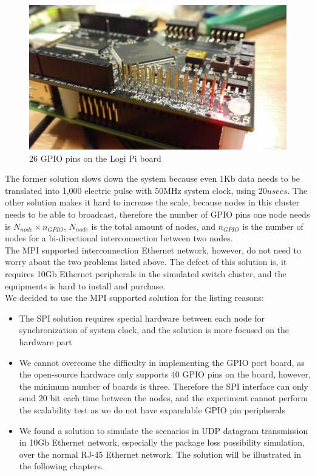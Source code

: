 \documentclass[11pt,openright,a4paper]{report}
\begin{document}
\begin{figure}[H]
	\centering
	\includegraphics[width=0.7\linewidth]{picture/photo/GPIOpin}
	\caption{26 GPIO pins on the Logi Pi board}
	\label{fig:GPIOpin}
\end{figure}
The former solution slows down the system because even 1Kb data needs to be translated into 1,000 electric pulse with 50MHz system clock, using 20$usecs$. The other solution makes it hard to increase the scale, because nodes in this cluster needs to be able to broadcast, therefore the number of GPIO pins one node needs is $N_{node}\times n_{GPIO}$, $N_{node}$ is the total amount of nodes, and $n_{GPIO}$ is the number of nodes for a bi-directional interconnection between two nodes.\\ 
The MPI supported interconnection Ethernet network, however, do not need to worry about the two problems listed above. The defect of this solution is, it requires 10Gb Ethernet peripherals in the simulated switch cluster, and the equipments is hard to install and purchase.\\
We decided to use the MPI supported solution for the listing reasons:
\begin{itemize}
	\item The SPI solution requires special hardware between each node for synchronization of system clock, and the solution is more focused on the hardware part
	\item We cannot overcome the difficulty in implementing the GPIO port board, as the open-source hardware only supports 40 GPIO pins on the board, however, the minimum number of boards is three. Therefore the SPI interface can only send 20 bit each time between the nodes, and the experiment cannot perform the scalability test as we do not have expandable GPIO pin peripherals
	\item We found a solution to simulate the scenarios in UDP datagram transmission in 10Gb Ethernet network, especially the package loss possibility simulation, over the normal RJ-45 Ethernet network. The solution will be illustrated in the following chapters.
\end{itemize}
\end{document}
